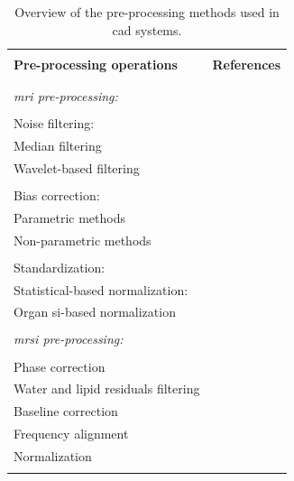 \begin{table}
  \caption{Overview of the pre-processing methods used in \ac{cad} systems.}
  \small
  \renewcommand{\arraystretch}{1}
  \begin{tabular}{p{.65\linewidth} p{.25\linewidth}}
    \hline \\ [-1.5ex]
    \textbf{Pre-processing operations} & \textbf{References} \\ \\ [-1.5ex]
    \hline \\ [-1.5ex]
    \textit{\ac{mri} pre-processing:} & \\ \\ [-1.5ex]
    \quad Noise filtering: &  \\
    \quad \quad Median filtering & \cite{Ozer2009,Ozer2010}  \\
    \quad \quad Wavelet-based filtering & \cite{Ampeliotis2007,Ampeliotis2008,Lopes2011} \\ \\ [-1.5ex]
    \quad Bias correction: & \\
    \quad \quad Parametric methods & \cite{Lv2009,Viswanath2009} \\
    \quad \quad Non-parametric methods & \cite{Viswanath2011} \\ \\ [-1.5ex]
    \quad Standardization: & \\
    \quad \quad Statistical-based normalization: & \cite{Artan2009,Artan2010,Lv2009,Ozer2009,Ozer2010,Viswanath2009,Viswanath2011,Viswanath2012} \\
    \quad \quad Organ \ac{si}-based normalization & \cite{Niaf2011,Niaf2012} \\ \\ [-1.5ex]
    \textit{\ac{mrsi} pre-processing:} & \\ \\ [-1.5ex]
    \quad Phase correction & \cite{Parfait2012} \\
    \quad Water and lipid residuals filtering & \cite{Kelm2007} \\
    \quad Baseline correction & \cite{Parfait2012,Tiwari2012} \\
    \quad Frequency alignment & \cite{Tiwari2012} \\
    \quad Normalization & \cite{Parfait2012} \\ \\ [-1.5ex]
    \hline
  \end{tabular}
\label{tab:summary-preproc}
\end{table}
